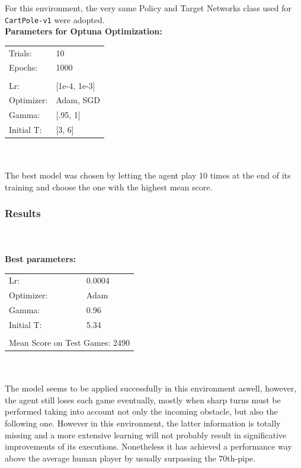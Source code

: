 \documentclass[11pt,a4paper,twocolumn]{IEEEtran}
\newcommand{\thinsepline}{\noindent\makebox[\linewidth]{\rule{7.5cm}{0.02pt}}}
\begin{document}
			For this environment, the very same Policy and Target Networks class used for \texttt{CartPole-v1} were adopted.
			\thinsepline\\
			\textbf{Parameters for Optuna Optimization:}\medskip\\
			\begin{tabular}{ll}
				Trials: & 10 \\
				Epochs: & 1000 \\
				\hline\vspace*{-.4cm}\\
				Lr: & [1e-4, 1e-3] \\
				Optimizer: & Adam, SGD\\
				Gamma: & [.95, 1]\\
				Initial T:& [3, 6]\\
			\end{tabular}\\
			\thinsepline\\
			The best model was chosen by letting the agent play 10 times at the end of its training and choose the one with the highest mean score.\\
			\subsubsection{\textbf{Results}}\text{   }\\
			\thinsepline\\
			\textbf{Best parameters:}\medskip\\
			\begin{tabular}{ll}
				Lr: & 0.0004 \\
				Optimizer: & Adam \\
				Gamma: & 0.96 \\
				Initial T:& 5.34 \\
				\hline\\
				\multicolumn{2}{l}{Mean Score on Test Games: 2490 }
				
			\end{tabular}\\
			\thinsepline\medskip\\
			The model seems to be applied successfully in this environment aswell, however, the agent still loses each game eventually, mostly when sharp turns must be performed taking into account not only the incoming obstacle, but also the following one. However in this environment, the latter information is totally missing and a more extensive learning will not probably result in significative improvements of its executions. Nonetheless it has achieved a performance way above the average human player by usually surpassing the 70th-pipe.
\end{document}
